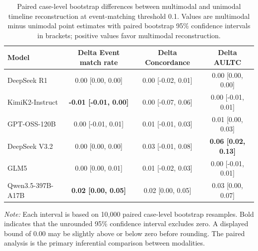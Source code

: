 \begin{table}[htbp]
\caption{Paired case-level bootstrap differences between multimodal and unimodal timeline reconstruction at event-matching threshold 0.1. Values are multimodal minus unimodal point estimates with paired bootstrap 95\% confidence intervals in brackets; positive values favor multimodal reconstruction.}
\ChEightTableBodyStart
\begin{ChEightFloatBody}

\small


\centering
\setlength{\tabcolsep}{5pt}
\begin{tabular}{@{}lccc@{}}
\toprule
\textbf{Model} & \textbf{Delta Event match rate} & \textbf{Delta Concordance} & \textbf{Delta AULTC} \\
\midrule
DeepSeek R1 & 0.00 [0.00, 0.00] & 0.00 [-0.02, 0.01] & 0.00 [0.00, 0.00] \\
KimiK2-Instruct & \textbf{-0.01 [-0.01, 0.00]} & 0.00 [-0.07, 0.06] & 0.00 [-0.01, 0.01] \\
GPT-OSS-120B & 0.00 [-0.01, 0.01] & 0.01 [-0.01, 0.03] & 0.01 [0.00, 0.03] \\
DeepSeek V3.2 & 0.00 [0.00, 0.00] & 0.03 [-0.01, 0.08] & \textbf{0.06 [0.02, 0.13]} \\
GLM5 & 0.00 [0.00, 0.01] & 0.01 [-0.02, 0.03] & 0.00 [-0.01, 0.01] \\
Qwen3.5-397B-A17B & \textbf{0.02 [0.00, 0.05]} & 0.02 [0.00, 0.05] & 0.03 [0.00, 0.07] \\
\bottomrule
\end{tabular}
\par
\begin{minipage}{\textwidth}
\footnotesize\textit{Note:} Each interval is based on 10,000 paired case-level bootstrap resamples. Bold indicates that the unrounded 95\% confidence interval excludes zero. A displayed bound of 0.00 may be slightly above or below zero before rounding. The paired analysis is the primary inferential comparison between modalities.
\end{minipage}

\end{ChEightFloatBody}
\end{table}